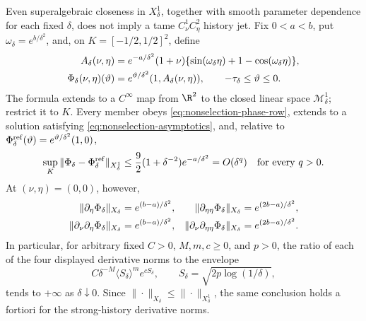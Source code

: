 \begin{proposition}
Even superalgebraic closeness in \(X^1_\delta\), together with smooth
parameter dependence for each fixed \(\delta\), does not imply a tame
\(C^1_\nu C^2_\eta\) history jet.  Fix \(0<a<b\), put
\(\omega_\delta=e^{b/\delta^2}\), and, on
\(K=[-1/2,1/2]^2\), define
\begin{align}
 A_\delta(\nu,\eta)
 &=e^{-a/\delta^2}(1+\nu)
   \{\sin(\omega_\delta\eta)+1-\cos(\omega_\delta\eta)\},\notag\\
 \Phi_\delta(\nu,\eta)(\vartheta)
 &=e^{\vartheta/\delta^2}
       (1,A_\delta(\nu,\eta)),
 \qquad -\tau_\delta\le\vartheta\le0.             \label{eq:nonselection-jet-family}
\end{align}
The formula extends to a \(C^\infty\) map from \(\R^2\) to the closed
linear space \(\mathcal M^1_\delta\); restrict it to \(K\).  Every member
obeys \cref{eq:nonselection-phase-row}, extends to a solution satisfying
\cref{eq:nonselection-asymptotics}, and, relative to
\(\Phi_\delta^{\rm ref}(\vartheta)=e^{\vartheta/\delta^2}(1,0)\),
\begin{equation}
 \sup_K\|\Phi_\delta-\Phi_\delta^{\rm ref}\|_{X^1_\delta}
 \le\frac92(1+\delta^{-2})e^{-a/\delta^2}
 =O(\delta^q)\quad\text{for every }q>0.              \label{eq:nonselection-flat-size}
\end{equation}
At \((\nu,\eta)=(0,0)\), however,
\begin{align}
 \|\partial_\eta\Phi_\delta\|_{X_\delta}
 &=e^{(b-a)/\delta^2},&
 \|\partial_{\eta\eta}\Phi_\delta\|_{X_\delta}
 &=e^{(2b-a)/\delta^2},\notag\\
 \|\partial_\nu\partial_\eta\Phi_\delta\|_{X_\delta}
 &=e^{(b-a)/\delta^2},&
 \|\partial_\nu\partial_{\eta\eta}\Phi_\delta\|_{X_\delta}
 &=e^{(2b-a)/\delta^2}.                              \label{eq:nonselection-jet-blowup}
\end{align}
In particular, for arbitrary fixed \(C>0\), \(M,m,c\ge0\), and \(p>0\),
the ratio of each of the four displayed derivative norms to the envelope
\begin{equation}
 C\delta^{-M}\langle S_\delta\rangle^m e^{cS_\delta},
 \qquad S_\delta=\sqrt{2p\log(1/\delta)},            \label{eq:nonselection-tame-envelope}
\end{equation}
tends to \(+\infty\) as \(\delta\downarrow0\).  Since
\(\|\cdot\|_{X_\delta}\le\|\cdot\|_{X^1_\delta}\), the same conclusion
holds a fortiori for the strong-history derivative norms.
\end{proposition}

